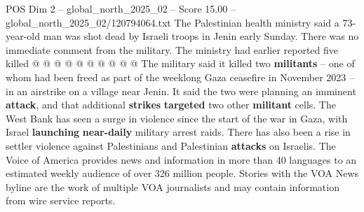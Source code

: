 \begin{textsample}{POS Dim 2 – global\_north\_2025\_02 – Score 15.00 – global\_north\_2025\_02/120794064.txt}
The Palestinian health ministry said a 73-year-old man was shot dead by Israeli troops in Jenin early Sunday.
There was no immediate comment from the military.
The ministry had earlier reported five killed @ @ @ @ @ @ @ @ @ @ The military said it killed two \textbf{militants} -- one of whom had been freed as part of the weeklong Gaza ceasefire in November 2023 -- in an airstrike on a village near Jenin.
It said the two were planning an imminent \textbf{attack}, and that additional \textbf{strikes} \textbf{targeted} two other \textbf{militant} cells.
The West Bank has seen a surge in violence since the start of the war in Gaza, with Israel \textbf{launching} \textbf{near-daily} military arrest raids.
There has also been a rise in settler violence against Palestinians and Palestinian \textbf{attacks} on Israelis.
The Voice of America provides news and information in more than 40 languages to an estimated weekly audience of over 326 million people.
Stories with the VOA News byline are the work of multiple VOA journalists and may contain information from wire service reports.

\end{textsample}
